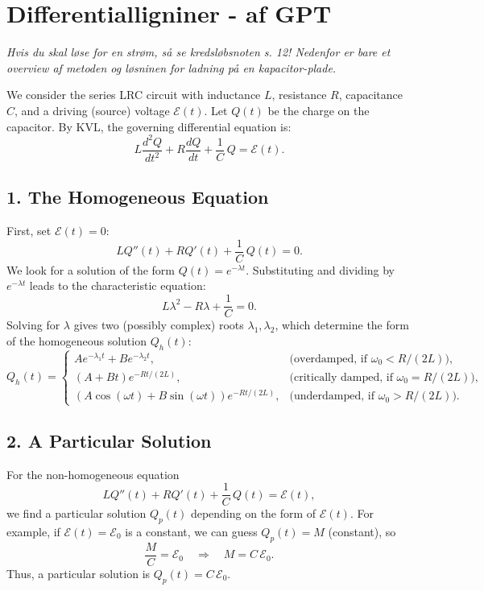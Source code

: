 \documentclass[a4paper]{article}
\begin{document}
    \newpage

    \section{Differentialligniner - af GPT}
    \textit{Hvis du skal løse for en strøm, så se kredsløbsnoten s. 12! Nedenfor er bare et overview af metoden og løsninen for ladning på en kapacitor-plade.}

    We consider the series LRC circuit with inductance $L$, resistance $R$, 
    capacitance $C$, and a driving (source) voltage $\mathcal{E}(t)$. Let $Q(t)$ be the 
    charge on the capacitor. By KVL, the governing differential equation is:
    \[
    L \frac{d^2 Q}{dt^2} + R \frac{dQ}{dt} + \frac{1}{C} \, Q = \mathcal{E} (t).
    \]
    \subsection*{1. The Homogeneous Equation}
    First, set $\mathcal{E}(t)=0$:
    \[
    L Q''(t) + R Q'(t) + \frac{1}{C} \, Q(t) = 0.
    \]
    We look for a solution of the form $Q(t) = e^{- \lambda t}$. Substituting and dividing 
    by $e^{- \lambda t}$ leads to the characteristic equation:
    \[
    L \lambda ^2 - R \lambda + \frac{1}{C} = 0.
    \]
    Solving for $\lambda $ gives two (possibly complex) roots $\lambda _1, \lambda _2$, which determine 
    the form of the homogeneous solution $Q_h(t)$:
    \[
    Q_h(t) = 
    \begin{cases}
    A e^{-\lambda _1 t} +B e^{- \lambda _2 t}, & \text{(overdamped, if $\omega _0 < R / (2L)$)}, \\
    (A + B t) e^{- Rt/(2L)}, & \text{(critically damped, if $\omega _0 = R / (2L)$)}, \\
    (A\cos(\omega t) + B \sin(\omega t))e^{- Rt/(2L)}, & \text{(underdamped, if $\omega _0 > R / (2L)$)}.
    \end{cases}
    \]

    \subsection*{2. A Particular Solution}
    For the non-homogeneous equation
    \[
    L Q''(t) + R Q'(t) + \frac{1}{C}\, Q(t) = \mathcal{E} (t),
    \]
    we find a particular solution $Q_p(t)$ depending on the form of $\mathcal{E} (t)$. For 
    example, if $\mathcal{E} (t) = \mathcal{E} _0$ is a constant, we can guess $Q_p(t) = M$ (constant), 
    so
    \[
    \frac{M}{C} = \mathcal{E} _0 \quad \Longrightarrow \quad M = C\, \mathcal{E} _0.
    \]
    Thus, a particular solution is $Q_p(t) = C\,\mathcal{E} _0$.
\end{document}
